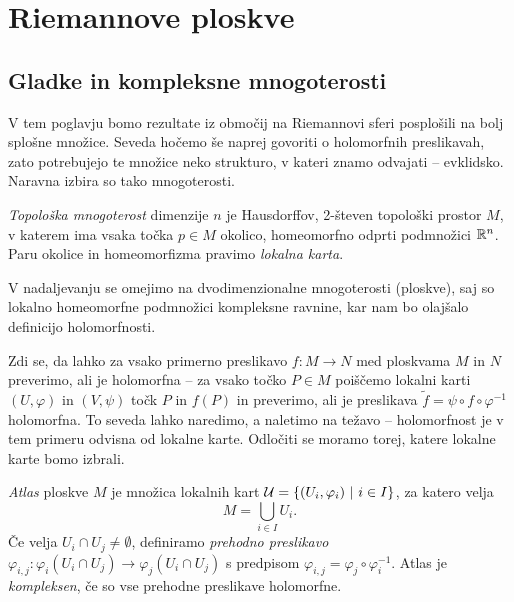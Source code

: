 \section{Riemannove ploskve}

\subsection{Gladke in kompleksne mnogoterosti}

V tem poglavju bomo rezultate iz območij na Riemannovi sferi
posplošili na bolj splošne množice. Seveda hočemo še naprej
govoriti o holomorfnih preslikavah, zato potrebujejo te množice
neko strukturo, v kateri znamo odvajati -- evklidsko. Naravna
izbira so tako mnogoterosti.

\begin{definicija}
\emph{Topološka mnogoterost} dimenzije $n$ je Hausdorffov, 2-števen
topološki prostor $M$, v katerem ima vsaka točka $p \in M$ okolico,
homeomorfno odprti podmnožici $\mathbb{R}^n$. Paru okolice in homeomorfizma
pravimo \emph{lokalna karta}.
\end{definicija}

V nadaljevanju se omejimo na dvodimenzionalne mnogoterosti
(ploskve), saj so lokalno homeomorfne podmnožici kompleksne
ravnine, kar nam bo olajšalo definicijo holomorfnosti.

Zdi se, da lahko za vsako primerno preslikavo $f \colon M \to N$
med ploskvama $M$ in $N$ preverimo, ali je holomorfna -- za vsako
točko $P \in M$ poiščemo lokalni karti $(U, \varphi)$ in
$(V, \psi)$ točk $P$ in $f(P)$ in preverimo, ali je preslikava
$\tilde{f} = \psi \circ f \circ \varphi^{-1}$ holomorfna. To seveda
lahko naredimo, a naletimo na težavo -- holomorfnost je v tem
primeru odvisna od lokalne karte. Odločiti se moramo torej, katere
lokalne karte bomo izbrali.

\begin{definicija}
\emph{Atlas} ploskve $M$ je množica lokalnih kart
$\mathcal{U} = \left\{(U_i, \varphi_i)~\middle\vert~i \in I\right\}$, za katero velja
\[
M = \bigcup_{i \in I} U_i.
\]
Če velja
$U_i \cap U_j \ne \emptyset$, definiramo \emph{prehodno preslikavo}
$\varphi_{i,j} \colon
\varphi_i(U_i \cap U_j) \to \varphi_j(U_i \cap U_j)$ s predpisom
$\varphi_{i,j} = \varphi_j \circ \varphi_i^{-1}$. Atlas je
\emph{kompleksen}, če so vse prehodne preslikave holomorfne.
\end{definicija}

